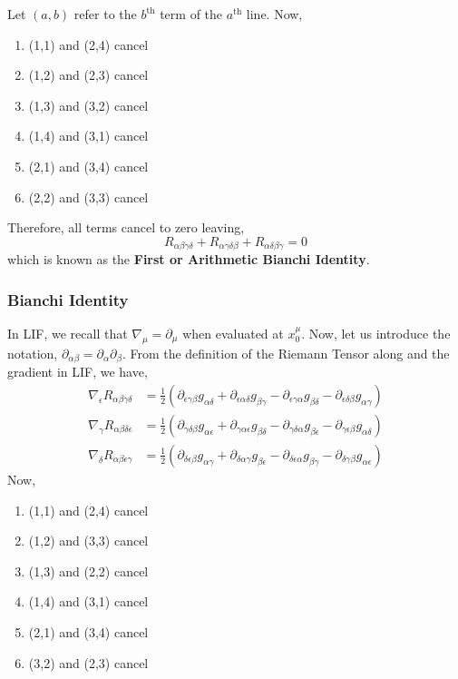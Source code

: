 \documentclass[11pt, a4paper]{article}
\begin{document}
Let $(a, b)$ refer to the $b^{\text{th}}$ term of the $a^{\text{th}}$ line. Now,
\begin{enumerate}
\item (1,1) and (2,4) cancel
\item (1,2) and (2,3) cancel
\item (1,3) and (3,2) cancel
\item (1,4) and (3,1) cancel
\item (2,1) and (3,4) cancel
\item (2,2) and (3,3) cancel
\end{enumerate}
Therefore, all terms cancel to zero leaving,
\[ R_{\alpha \beta \gamma \delta} + R_{\alpha \gamma \delta \beta} + R_{\alpha \delta \beta \gamma} = 0 \]
which is known as the \textbf{First or Arithmetic Bianchi Identity}.
\subsubsection{Bianchi Identity}
In LIF, we recall that $\nabla_\mu = \partial_\mu$ when evaluated at $x^\mu _0$.  Now, let us introduce the notation, $\partial_{\alpha\beta} = \partial_\alpha\partial_\beta$.  From the definition of the Riemann Tensor along and the gradient in LIF, we have, 
\begin{align*}
\nabla_\epsilon R_{\alpha\beta\gamma\delta} &= \tfrac{1}{2}\left(\partial_{\epsilon\gamma\beta} g_{\alpha\delta} + \partial_{\epsilon\alpha\delta} g_{\beta\gamma} - \partial_{\epsilon\gamma\alpha}g_{\beta\delta} - \partial_{\epsilon\delta\beta}g_{\alpha\gamma}\right)
    \\
\nabla_\gamma R_{\alpha\beta\delta\epsilon} &= \tfrac{1}{2}\left(\partial_{\gamma\delta\beta} g_{\alpha\epsilon} + \partial_{\gamma\alpha\epsilon} g_{\beta\delta} - \partial_{\gamma\delta\alpha}g_{\beta\epsilon} - \partial_{\gamma\epsilon\beta}g_{\alpha\delta}\right)
    \\
\nabla_\delta R_{\alpha\beta\epsilon\gamma} &= \tfrac{1}{2}\left(\partial_{\delta\epsilon\beta} g_{\alpha\gamma} + \partial_{\delta\alpha\gamma} g_{\beta\epsilon} - \partial_{\delta\epsilon\alpha}g_{\beta\gamma} - \partial_{\delta\gamma\beta} g_{\alpha\epsilon}\right)
\end{align*}
Now,
\begin{enumerate}
\item (1,1) and (2,4) cancel
\item (1,2) and (3,3) cancel
\item (1,3) and (2,2) cancel
\item (1,4) and (3,1) cancel
\item (2,1) and (3,4) cancel
\item (3,2) and (2,3) cancel
\end{enumerate}
\end{document}
